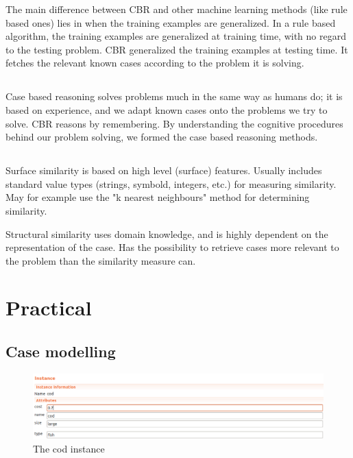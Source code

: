 \documentclass{article}
\begin{document}
The main difference between CBR and other machine learning methods (like rule based ones) lies in when the training examples are generalized. In a rule based algorithm, the training examples are generalized at training time, with no regard to the testing problem. CBR generalized the training examples at testing time. It fetches the relevant known cases according to the problem it is solving.

\subsection{}
Case based reasoning solves problems much in the same way as humans do; it is based on experience, and we adapt known cases onto the problems we try to solve. CBR reasons by remembering. By understanding the cognitive procedures behind our problem solving, we formed the case based reasoning methods.

\subsection{}
Surface similarity is based on high level (surface) features. Usually includes standard value types (strings, symbold, integers, etc.) for measuring similarity. May for example use the "k nearest neighbours" method for determining similarity.

Structural similarity uses domain knowledge, and is highly dependent on the representation of the case. Has the possibility to retrieve cases more relevant to the problem than the similarity measure can.


\section{Practical}
\subsection{Case modelling}
\begin{figure}[H]
  \centering
    \includegraphics[width=1.0\textwidth]{cod-instance.png}
    \caption{The cod instance}
    \label{fig:cod-instance}
\end{figure}
\end{document}
